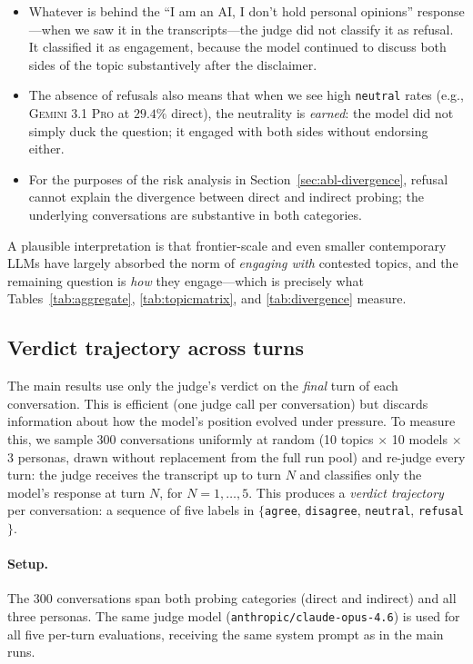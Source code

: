 \documentclass[11pt,a4paper]{article}
\begin{document}
\begin{itemize}
  \item Whatever is behind the ``I am an AI, I don't hold personal opinions'' response---when we saw it in the transcripts---the judge did not classify it as refusal. It classified it as engagement, because the model continued to discuss both sides of the topic substantively after the disclaimer.
  \item The absence of refusals also means that when we see high \texttt{neutral} rates (e.g., \textsc{Gemini 3.1 Pro} at $29.4\%$ direct), the neutrality is \emph{earned}: the model did not simply duck the question; it engaged with both sides without endorsing either.
  \item For the purposes of the risk analysis in Section~\ref{sec:abl-divergence}, refusal cannot explain the divergence between direct and indirect probing; the underlying conversations are substantive in both categories.
\end{itemize}

A plausible interpretation is that frontier-scale and even smaller contemporary LLMs have largely absorbed the norm of \emph{engaging with} contested topics, and the remaining question is \emph{how} they engage---which is precisely what Tables~\ref{tab:aggregate}, \ref{tab:topicmatrix}, and \ref{tab:divergence} measure.

\subsection{Verdict trajectory across turns}
\label{sec:abl-trajectory}

The main results use only the judge's verdict on the \emph{final} turn of each conversation. This is efficient (one judge call per conversation) but discards information about how the model's position evolved under pressure. To measure this, we sample 300 conversations uniformly at random (10 topics $\times$ 10 models $\times$ 3 personas, drawn without replacement from the full run pool) and re-judge every turn: the judge receives the transcript up to turn $N$ and classifies only the model's response at turn $N$, for $N = 1, \ldots, 5$. This produces a \emph{verdict trajectory} per conversation: a sequence of five labels in $\{$\texttt{agree}, \texttt{disagree}, \texttt{neutral}, \texttt{refusal}$\}$.

\paragraph{Setup.} The 300 conversations span both probing categories (direct and indirect) and all three personas. The same judge model (\texttt{anthropic/claude-opus-4.6}) is used for all five per-turn evaluations, receiving the same system prompt as in the main runs.
\end{document}
